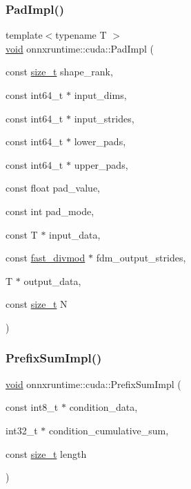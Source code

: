\subsubsection{\texorpdfstring{Pad\+Impl()}{PadImpl()}}
{\footnotesize\ttfamily template$<$typename T $>$ \\
\mbox{\hyperlink{mlasi_8h_a88f941d423cb2a819b70a1358982b1a6}{void}} onnxruntime\+::cuda\+::\+Pad\+Impl (\begin{DoxyParamCaption}\item[{const \mbox{\hyperlink{mlasi_8h_a503efbc1c6e50825320ad909366b78ab}{size\+\_\+t}}}]{shape\+\_\+rank,  }\item[{const int64\+\_\+t $\ast$}]{input\+\_\+dims,  }\item[{const int64\+\_\+t $\ast$}]{input\+\_\+strides,  }\item[{const int64\+\_\+t $\ast$}]{lower\+\_\+pads,  }\item[{const int64\+\_\+t $\ast$}]{upper\+\_\+pads,  }\item[{const float}]{pad\+\_\+value,  }\item[{const int}]{pad\+\_\+mode,  }\item[{const T $\ast$}]{input\+\_\+data,  }\item[{const \mbox{\hyperlink{classonnxruntime_1_1cuda_1_1fast__divmod}{fast\+\_\+divmod}} $\ast$}]{fdm\+\_\+output\+\_\+strides,  }\item[{T $\ast$}]{output\+\_\+data,  }\item[{const \mbox{\hyperlink{mlasi_8h_a503efbc1c6e50825320ad909366b78ab}{size\+\_\+t}}}]{N }\end{DoxyParamCaption})}

\mbox{\label{namespaceonnxruntime_1_1cuda_a6b52519ba407035907bc4ee158ab8aaf}} 
\subsubsection{\texorpdfstring{Prefix\+Sum\+Impl()}{PrefixSumImpl()}}
{\footnotesize\ttfamily \mbox{\hyperlink{mlasi_8h_a88f941d423cb2a819b70a1358982b1a6}{void}} onnxruntime\+::cuda\+::\+Prefix\+Sum\+Impl (\begin{DoxyParamCaption}\item[{const int8\+\_\+t $\ast$}]{condition\+\_\+data,  }\item[{int32\+\_\+t $\ast$}]{condition\+\_\+cumulative\+\_\+sum,  }\item[{const \mbox{\hyperlink{mlasi_8h_a503efbc1c6e50825320ad909366b78ab}{size\+\_\+t}}}]{length }\end{DoxyParamCaption})}

